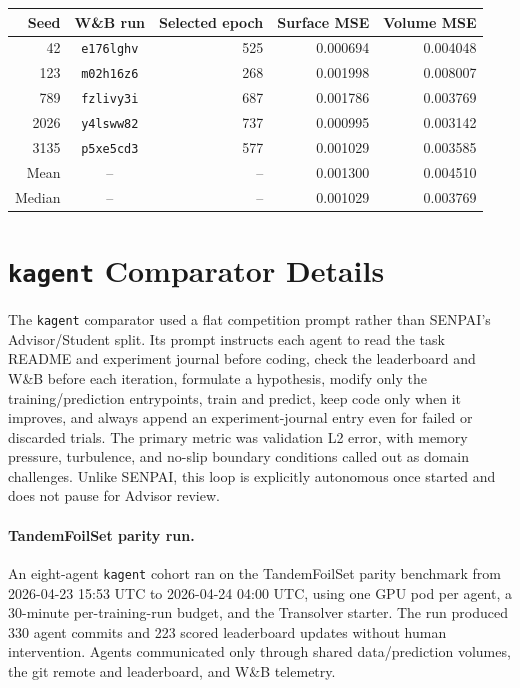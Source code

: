 \documentclass{article}
\begin{document}
\begin{center}
  \label{tab:app-airfrans-seeds}
  \small
  \begin{tabular}{@{}rcrrr@{}}
    \toprule
    Seed & W\&B run & Selected epoch & Surface MSE & Volume MSE \\
    \midrule
    42 & \texttt{e176lghv} & 525 & 0.000694 & 0.004048 \\
    123 & \texttt{m02h16z6} & 268 & 0.001998 & 0.008007 \\
    789 & \texttt{fzlivy3i} & 687 & 0.001786 & 0.003769 \\
    2026 & \texttt{y4lsww82} & 737 & 0.000995 & 0.003142 \\
    3135 & \texttt{p5xe5cd3} & 577 & 0.001029 & 0.003585 \\
    \midrule
    Mean & -- & -- & 0.001300 & 0.004510 \\
    Median & -- & -- & 0.001029 & 0.003769 \\
    \bottomrule
  \end{tabular}
\end{center}

\section{\texttt{kagent} Comparator Details}
\label{app:kagent-details}

The \texttt{kagent} comparator used a flat competition prompt rather than SENPAI's Advisor/Student split. Its prompt instructs each agent to read the task README and experiment journal before coding, check the leaderboard and W\&B before each iteration, formulate a hypothesis, modify only the training/prediction entrypoints, train and predict, keep code only when it improves, and always append an experiment-journal entry even for failed or discarded trials. The primary metric was validation L2 error, with memory pressure, turbulence, and no-slip boundary conditions called out as domain challenges. Unlike SENPAI, this loop is explicitly autonomous once started and does not pause for Advisor review.

\paragraph{TandemFoilSet parity run.}
An eight-agent \texttt{kagent} cohort ran on the TandemFoilSet parity benchmark from 2026-04-23 15:53 UTC to 2026-04-24 04:00 UTC, using one GPU pod per agent, a 30-minute per-training-run budget, and the Transolver starter. The run produced 330 agent commits and 223 scored leaderboard updates without human intervention. Agents communicated only through shared data/prediction volumes, the git remote and leaderboard, and W\&B telemetry.
\end{document}
